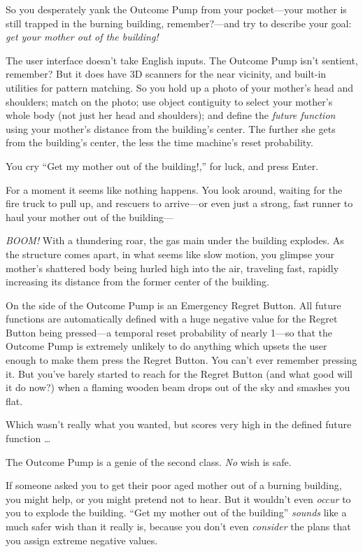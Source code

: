 {
 So you desperately yank the Outcome Pump from your pocket---your
mother is still trapped in the burning building, remember?---and try to
describe your goal: \textit{get your mother out of the building!}}

{
 The user interface doesn't take English inputs.
The Outcome Pump isn't sentient, remember? But it does
have 3D scanners for the near vicinity, and built-in utilities for
pattern matching. So you hold up a photo of your
mother's head and shoulders; match on the photo; use
object contiguity to select your mother's whole body
(not just her head and shoulders); and define the \textit{future
function} using your mother's distance from the
building's center. The further she gets from the
building's center, the less the time
machine's reset probability.}

{
 You cry ``Get my mother out of the
building!,'' for luck, and press Enter.}

{
 For a moment it seems like nothing happens. You look around,
waiting for the fire truck to pull up, and rescuers to arrive---or even
just a strong, fast runner to haul your mother out of the building---}

{
 \textit{BOOM!} With a thundering roar, the gas main under the
building explodes. As the structure comes apart, in what seems like
slow motion, you glimpse your mother's shattered body
being hurled high into the air, traveling fast, rapidly increasing its
distance from the former center of the building.}

{
 On the side of the Outcome Pump is an Emergency Regret Button. All
future functions are automatically defined with a huge negative value
for the Regret Button being pressed---a temporal reset probability of
nearly 1---so that the Outcome Pump is extremely unlikely to do
anything which upsets the user enough to make them press the Regret
Button. You can't ever remember pressing it. But
you've barely started to reach for the Regret Button
(and what good will it do now?) when a flaming wooden beam drops out of
the sky and smashes you flat.}

{
 Which wasn't really what you wanted, but scores
very high in the defined future function \ldots}

{
 The Outcome Pump is a genie of the second class. \textit{No} wish
is safe.}

{
 If someone asked you to get their poor aged mother out of a
burning building, you might help, or you might pretend not to hear. But
it wouldn't even \textit{occur} to you to explode the
building. ``Get my mother out of the
building'' \textit{sounds} like a much safer wish
than it really is, because you don't even
\textit{consider} the plans that you assign extreme negative values.}

